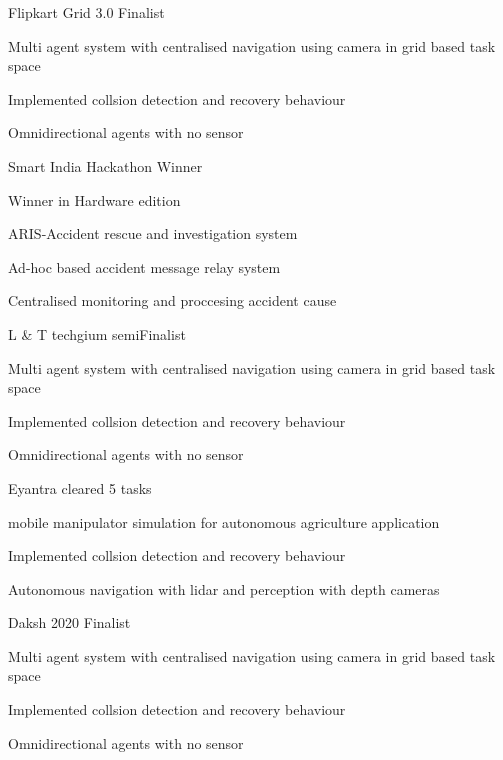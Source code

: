
\begin{cventries}
	\cventry
	{} %
	{Flipkart Grid 3.0} %
	{Finalist} %
	{} %
	{
		\begin{cvitems} %
			\item {Multi agent system with centralised navigation using camera in grid based task space}
			\item {Implemented collsion detection and recovery behaviour}
			\item {Omnidirectional agents with no sensor}
		\end{cvitems}
	}
	\cventry
	{} %
	{Smart India Hackathon} %
	{Winner} %
	{} %
	{
		\begin{cvitems} %
			\item {Winner in Hardware edition}
			\item {ARIS-Accident rescue and investigation system}
			\item {Ad-hoc based accident message relay system}
			\item {Centralised monitoring and proccesing accident cause}
		\end{cvitems}
	}
	\cventry
	{} %
	{L \& T techgium} %
	{semi\-Finalist} %
	{} %
	{
		\begin{cvitems} %
			\item {Multi agent system with centralised navigation using camera in grid based task space}
			\item {Implemented collsion detection and recovery behaviour}
			\item {Omnidirectional agents with no sensor}
		\end{cvitems}
	}
	\cventry
	{} %
	{Eyantra} %
	{cleared 5 tasks} %
	{} %
	{
		\begin{cvitems} %
			\item {mobile manipulator simulation for autonomous agriculture application}
			\item {Implemented collsion detection and recovery behaviour}
			\item {Autonomous navigation with lidar and perception with depth cameras}
		\end{cvitems}
	}
	\cventry
	{} %
	{Daksh 2020} %
	{Finalist} %
	{} %
	{
		\begin{cvitems} %
			\item {Multi agent system with centralised navigation using camera in grid based task space}
			\item {Implemented collsion detection and recovery behaviour}
			\item {Omnidirectional agents with no sensor}
		\end{cvitems}
	}
\end{cventries}
